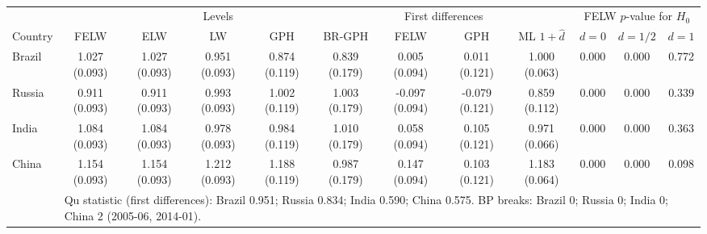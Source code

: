 \begin{table}[!htbp]
\caption{}
\centering
\begin{adjustbox}{width=\textwidth}
\begin{tabular}{lccccccccccc}
\hline
 & \multicolumn{5}{c}{Levels} & \multicolumn{2}{c}{First differences} & & \multicolumn{3}{c}{FELW $p$-value for $H_0$} \\
Country & FELW & ELW & LW & GPH & BR-GPH & FELW & GPH & ML $1+\hat{d}$ & $d=0$ & $d=1/2$ & $d=1$ \\ \hline
Brazil & 1.027 (0.093) & 1.027 (0.093) & 0.951 (0.093) & 0.874 (0.119) & 0.839 (0.179) & 0.005 (0.094) & 0.011 (0.121) & 1.000 (0.063) & 0.000 & 0.000 & 0.772 \\
Russia & 0.911 (0.093) & 0.911 (0.093) & 0.993 (0.093) & 1.002 (0.119) & 1.003 (0.179) & -0.097 (0.094) & -0.079 (0.121) & 0.859 (0.112) & 0.000 & 0.000 & 0.339 \\
India & 1.084 (0.093) & 1.084 (0.093) & 0.978 (0.093) & 0.984 (0.119) & 1.010 (0.179) & 0.058 (0.094) & 0.105 (0.121) & 0.971 (0.066) & 0.000 & 0.000 & 0.363 \\
China & 1.154 (0.093) & 1.154 (0.093) & 1.212 (0.093) & 1.188 (0.119) & 0.987 (0.179) & 0.147 (0.094) & 0.103 (0.121) & 1.183 (0.064) & 0.000 & 0.000 & 0.098 \\
\hline
 & \multicolumn{11}{l}{Qu statistic (first differences): Brazil 0.951; Russia 0.834; India 0.590; China 0.575. BP breaks: Brazil 0; Russia 0; India 0; China 2 (2005-06, 2014-01).} \\
\hline
\end{tabular}
\end{adjustbox}
\label{tab:long_memory_er}
\end{table}
